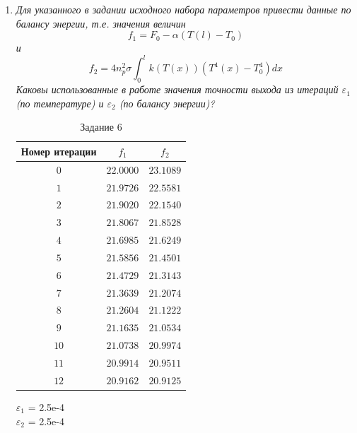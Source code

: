 \begin{enumerate}
	\item \textit{Для указанного в задании исходного набора параметров привести данные по балансу энергии, т.е. значения величин
	\begin{equation}\label{formula7}
		f_1 = F_0 - \alpha(T(l) - T_0)
	\end{equation}
	и
	\begin{equation}\label{formula8}
		f_2 = 4n_p^2 \sigma \int_0^l k(T(x))(T^4(x) - T_0^4)dx
	\end{equation}
	Каковы использованные в работе значения точности выхода из итераций
	$\varepsilon_1$ (по температуре) и
	$\varepsilon_2$ (по балансу энергии)?}
	
	\begin{table}[h]\label{table_2}
		\caption{Задание 6}
		\centering
		\begin{tabular}{|c|c|c|}
			\hline
			Номер итерации & $f_1$ & $f_2$\\
			\hline
			$0$ &$22.0000$ &$23.1089$ \\
			\hline
			$1$ &$21.9726$ &$22.5581$ \\
			\hline
			$2$ &$21.9020$ &$22.1540$ \\
			\hline
			$3$ &$21.8067$ &$21.8528$ \\
			\hline
			$4$ &$21.6985$ &$21.6249$ \\
			\hline
			$5$ &$21.5856$ &$21.4501$ \\
			\hline
			$6$ &$21.4729$ &$21.3143$ \\
			\hline
			$7$ &$21.3639$ &$21.2074$ \\
			\hline
			$8$ &$21.2604$ &$21.1222$ \\
			\hline
			$9$ &$21.1635$ &$21.0534$ \\
			\hline
			$10$ &$21.0738$ &$20.9974$ \\
			\hline
			$11$ &$20.9914$ &$20.9511$ \\
			\hline
			$12$ &$20.9162$ &$20.9125$ \\
			\hline
		\end{tabular}
	\end{table}

	$\varepsilon_1$ = 2.5e-4 \\
	$\varepsilon_2$ = 2.5e-4
	

\end{enumerate}